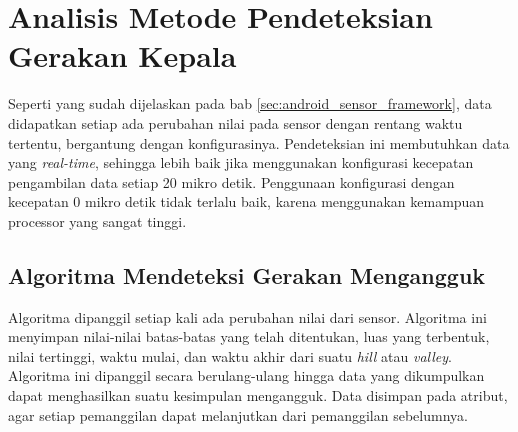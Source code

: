 \section{Analisis Metode Pendeteksian Gerakan Kepala}
\label{sec:analisis_metode_pendeteksi_gerakan_kepala}

Seperti yang sudah dijelaskan pada bab \ref{sec:android_sensor_framework}, data didapatkan setiap ada perubahan nilai pada sensor dengan rentang waktu tertentu, bergantung dengan konfigurasinya. Pendeteksian ini membutuhkan data yang \textit{real-time}, sehingga lebih baik jika menggunakan konfigurasi kecepatan pengambilan data setiap 20 mikro detik. Penggunaan konfigurasi dengan kecepatan 0 mikro detik tidak terlalu baik, karena menggunakan kemampuan processor yang sangat tinggi.

\subsection{Algoritma Mendeteksi Gerakan Mengangguk}
\label{ssec:algoritma_mendeteksi_gerakan_mengangguk}

Algoritma dipanggil setiap kali ada perubahan nilai dari sensor. Algoritma ini menyimpan nilai-nilai batas-batas yang telah ditentukan, luas yang terbentuk, nilai tertinggi, waktu mulai, dan waktu akhir dari suatu \textit{hill} atau \textit{valley}. Algoritma ini dipanggil secara berulang-ulang hingga data yang dikumpulkan dapat menghasilkan suatu kesimpulan mengangguk. Data disimpan pada atribut, agar setiap pemanggilan dapat melanjutkan dari pemanggilan sebelumnya. 

